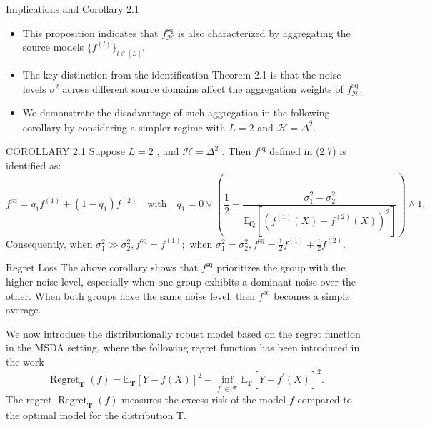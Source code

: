 \documentclass{beamer}
\begin{document}
\begin{frame}{Implications and Corollary 2.1}
    \begin{itemize}
        \item This proposition indicates that $f _ { \mathcal { H } } ^ { \mathrm { s q } }$ is also characterized by aggregating the source models $\{ f ^ { ( l ) } \} _ { l \in [ L ] }$.
        \item The key distinction from the identification Theorem 2.1 is that the noise levels $\sigma ^ { 2 }$ across different source domains affect the aggregation weights of $f _ { \mathcal { H } } ^ { \mathrm { s q } }$.
        \item We demonstrate the disadvantage of such aggregation in the following corollary by considering a simpler regime with $L = 2$ and $\mathcal { H } = \Delta ^ { \bar { 2 } }$.
    \end{itemize}

    \begin{block}{COROLLARY 2.1}
        Suppose $L = 2$ , and $\mathcal { H } = \Delta ^ { 2 }$ . Then $f ^ { \mathrm { s q } }$ defined in (2.7) is identified as:
        \begin{equation*}
            f ^ {\mathrm{sq}} = q _ {1} f ^ {(1)} + (1 - q _ {1}) f ^ {(2)} \quad \mathrm{with} \quad q _ {1} = 0 \lor \left(\frac {1}{2} + \frac {\sigma_ {1} ^ {2} - \sigma_ {2} ^ {2}}{\mathbb {E} _ {\mathbf {Q}} [ (f ^ {(1)} (X) - f ^ {(2)} (X)) ^ {2} ]}\right) \land 1.
        \end{equation*}
        Consequently, when $\sigma _ { 1 } ^ { 2 } \gg \sigma _ { 2 } ^ { 2 } , f ^ { \mathrm { s q } } = f ^ { ( 1 ) } ;$ when $\sigma _ { 1 } ^ { 2 } = \sigma _ { 2 } ^ { 2 } , f ^ { \mathrm { s q } } = \frac { 1 } { 2 } f ^ { ( 1 ) } + \frac { 1 } { 2 } f ^ { ( 2 ) }$.
    \end{block}
\end{frame}

\begin{frame}{Regret Loss}
    The above corollary shows that $f ^ { \mathrm { s q } }$ prioritizes the group with the higher noise level, especially when one group exhibits a dominant noise over the other. When both groups have the same noise level, then $f ^ { \mathrm { s q } }$ becomes a simple average.

    We now introduce the distributionally robust model based on the regret function in the MSDA setting, where the following regret function has been introduced in the work \cite{1}
    \begin{equation*}
        \operatorname{Regret} _ {\mathbf {T}} (f) = \mathbb {E} _ {\mathbf {T}} [ Y - f (X) ] ^ {2} - \inf _ {f ^ {\prime} \in \mathcal {F}} \mathbb {E} _ {\mathbf {T}} [ Y - f ^ {\prime} (X) ] ^ {2}.
    \end{equation*}
    The regret $\operatorname { R e g r e t } _ { \mathbf { T } } ( f )$ measures the excess risk of the model $f$ compared to the optimal model for the distribution T.
\end{frame}
\end{document}
